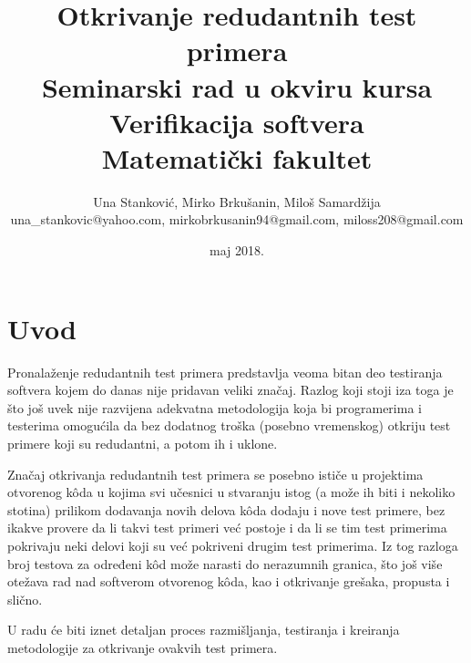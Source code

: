 \documentclass[a4paper]{article}
\begin{document}
\title{Otkrivanje redudantnih test primera\\ \small{Seminarski rad u okviru kursa\\Verifikacija softvera\\ Matematički fakultet}}

\author{Una Stanković, Mirko Brkušanin, Miloš Samardžija\\ una\_stankovic@yahoo.com, mirkobrkusanin94@gmail.com, miloss208@gmail.com}
\date{maj 2018.}
\maketitle


\tableofcontents
 
\newpage

\section{Uvod}
\label{sec:introduction}

Pronalaženje redudantnih test primera predstavlja veoma bitan deo testiranja softvera kojem do danas nije pridavan veliki značaj. Razlog koji stoji iza toga je što još uvek nije razvijena adekvatna metodologija koja bi programerima i testerima omogućila da bez dodatnog troška (posebno vremenskog) otkriju test primere koji su redudantni, a potom ih i uklone.

Značaj otkrivanja redudantnih test primera se posebno ističe u projektima otvorenog kôda u kojima svi učesnici u stvaranju istog (a može ih biti i nekoliko stotina) prilikom dodavanja novih delova kôda dodaju i nove test primere, bez ikakve provere da li takvi test primeri već postoje i da li se tim test primerima pokrivaju neki delovi koji su već pokriveni drugim test primerima. Iz tog razloga broj testova za određeni kôd može narasti do nerazumnih granica, što još više otežava rad nad softverom otvorenog kôda, kao i otkrivanje grešaka, propusta i slično. 

U radu će biti iznet detaljan proces razmišljanja, testiranja i kreiranja metodologije za otkrivanje ovakvih test primera.
\end{document}

